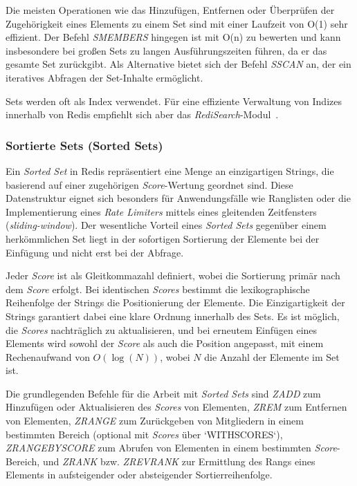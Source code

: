 Die meisten Operationen wie das Hinzufügen, Entfernen oder Überprüfen der Zugehörigkeit eines Elements zu einem Set sind mit einer Laufzeit von O(1) sehr effizient.
Der Befehl \emph{SMEMBERS} hingegen ist mit O(n) zu bewerten und kann insbesondere bei großen Sets zu langen Ausführungszeiten führen, da er das gesamte Set zurückgibt.
Als Alternative bietet sich der Befehl \emph{SSCAN} an, der ein iteratives Abfragen der Set-Inhalte ermöglicht.

Sets werden oft als Index verwendet. Für eine effiziente Verwaltung von Indizes innerhalb von Redis empfiehlt sich aber das \emph{RediSearch}-Modul~\cite{redis_ltd_sets_nodate}.


\subsubsection{Sortierte Sets (Sorted Sets)}
Ein \emph{Sorted Set} in Redis repräsentiert eine Menge an einzigartigen Strings, die basierend auf einer zugehörigen \emph{Score}-Wertung geordnet sind. Diese Datenstruktur eignet sich besonders für Anwendungsfälle wie Ranglisten oder die Implementierung eines \emph{Rate Limiters} mittels eines gleitenden Zeitfensters (\emph{sliding-window}). Der wesentliche Vorteil eines \emph{Sorted Sets} gegenüber einem herkömmlichen Set liegt in der sofortigen Sortierung der Elemente bei der Einfügung und nicht erst bei der Abfrage. %

Jeder \emph{Score} ist als Gleitkommazahl definiert, wobei die Sortierung primär nach dem \emph{Score} erfolgt. Bei identischen \emph{Scores} bestimmt die lexikographische Reihenfolge der Strings die Positionierung der Elemente. Die Einzigartigkeit der Strings garantiert dabei eine klare Ordnung innerhalb des Sets. Es ist möglich, die \emph{Scores} nachträglich zu aktualisieren, und bei erneutem Einfügen eines Elements wird sowohl der \emph{Score} als auch die Position angepasst, mit einem Rechenaufwand von \(O(\log(N))\), wobei \(N\) die Anzahl der Elemente im Set ist.

Die grundlegenden Befehle für die Arbeit mit \emph{Sorted Sets} sind \emph{ZADD} zum Hinzufügen oder Aktualisieren des \emph{Scores} von Elementen, \emph{ZREM} zum Entfernen von Elementen, \emph{ZRANGE} zum Zurückgeben von Mitgliedern in einem bestimmten Bereich (optional mit \emph{Scores} über `WITHSCORES`), \emph{ZRANGEBYSCORE} zum Abrufen von Elementen in einem bestimmten \emph{Score}-Bereich, und \emph{ZRANK} bzw. \emph{ZREVRANK} zur Ermittlung des Rangs eines Elements in aufsteigender oder absteigender Sortierreihenfolge.


